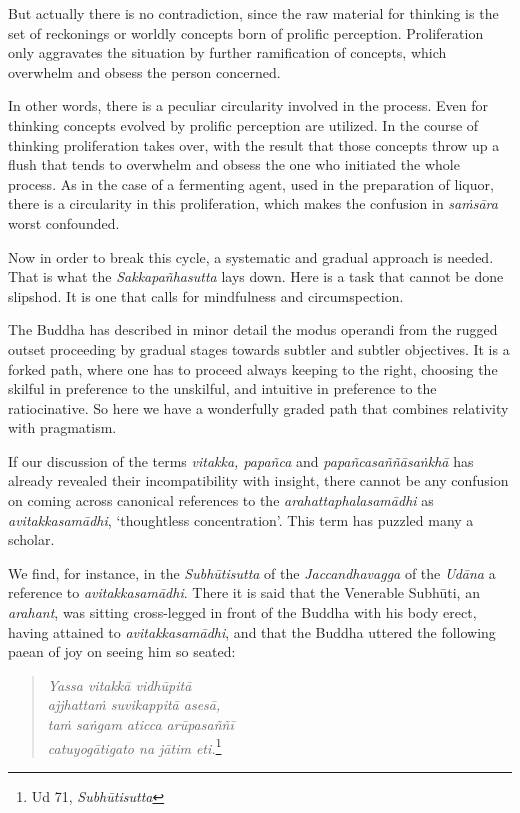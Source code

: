 But actually there is no contradiction, since the raw material for thinking is the set of reckonings or worldly concepts born of prolific perception. Proliferation only aggravates the situation by further ramification of concepts, which overwhelm and obsess the person concerned.

In other words, there is a peculiar circularity involved in the process. Even for thinking concepts evolved by prolific perception are utilized. In the course of thinking proliferation takes over, with the result that those concepts throw up a flush that tends to overwhelm and obsess the one who initiated the whole process. As in the case of a fermenting agent, used in the preparation of liquor, there is a circularity in this proliferation, which makes the confusion in \emph{saṁsāra} worst confounded.

Now in order to break this cycle, a systematic and gradual approach is needed. That is what the \emph{Sakkapañhasutta} lays down. Here is a task that cannot be done slipshod. It is one that calls for mindfulness and circumspection.

The Buddha has described in minor detail the modus operandi from the rugged outset proceeding by gradual stages towards subtler and subtler objectives. It is a forked path, where one has to proceed always keeping to the right, choosing the skilful in preference to the unskilful, and intuitive in preference to the ratiocinative. So here we have a wonderfully graded path that combines relativity with pragmatism.

If our discussion of the terms \emph{vitakka, papañca} and \emph{papañcasaññāsaṅkhā} has already revealed their incompatibility with insight, there cannot be any confusion on coming across canonical references to the \emph{arahattaphalasamādhi} as \emph{avitakkasamādhi}, `thoughtless concentration'. This term has puzzled many a scholar.

We find, for instance, in the \emph{Subhūtisutta} of the \emph{Jaccandhavagga} of the \emph{Udāna} a reference to \emph{avitakkasamādhi}. There it is said that the Venerable Subhūti, an \emph{arahant}, was sitting cross-legged in front of the Buddha with his body erect, having attained to \emph{avitakkasamādhi}, and that the Buddha uttered the following paean of joy on seeing him so seated:

\begin{quote}
\emph{Yassa vitakkā vidhūpitā}\\
\emph{ajjhattaṁ suvikappitā asesā,}\\
\emph{taṁ saṅgam aticca arūpasaññī}\\
\emph{catuyogātigato na jātim eti.}\footnote{Ud 71, \emph{Subhūtisutta}}
\end{quote}

